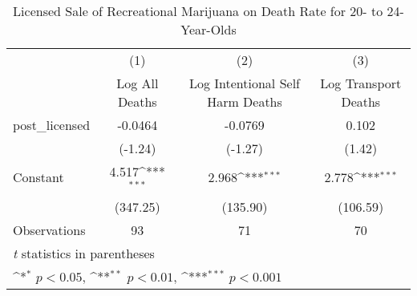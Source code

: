 \begin{table}[htbp]\centering
\def\sym#1{\ifmmode^{#1}\else\(^{#1}\)\fi}
\caption{Licensed Sale of Recreational Marijuana on Death Rate for 20- to 24-Year-Olds}
\begin{tabular}{l*{3}{c}}
\hline\hline
                    &\multicolumn{1}{c}{(1)}&\multicolumn{1}{c}{(2)}&\multicolumn{1}{c}{(3)}\\
                    &\multicolumn{1}{c}{Log All Deaths}&\multicolumn{1}{c}{Log Intentional Self Harm Deaths}&\multicolumn{1}{c}{Log Transport Deaths}\\
\hline
post\_licensed       &     -0.0464         &     -0.0769         &       0.102         \\
                    &     (-1.24)         &     (-1.27)         &      (1.42)         \\
[1em]
Constant            &       4.517\sym{***}&       2.968\sym{***}&       2.778\sym{***}\\
                    &    (347.25)         &    (135.90)         &    (106.59)         \\
\hline
Observations        &          93         &          71         &          70         \\
\hline\hline
\multicolumn{4}{l}{\footnotesize \textit{t} statistics in parentheses}\\
\multicolumn{4}{l}{\footnotesize \sym{*} \(p<0.05\), \sym{**} \(p<0.01\), \sym{***} \(p<0.001\)}\\
\end{tabular}
\end{table}
